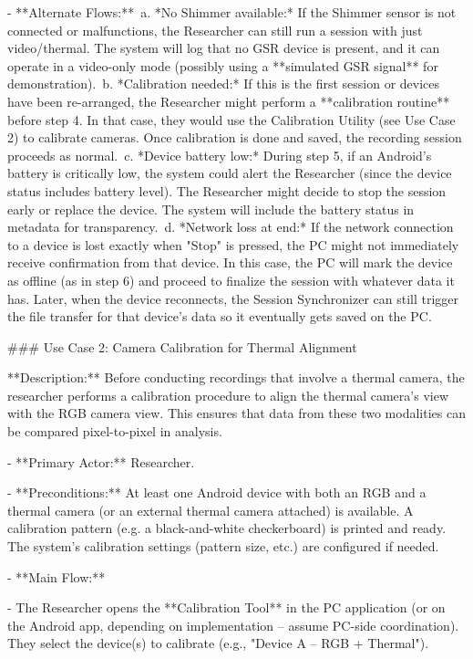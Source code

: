 \documentclass[12pt,a4paper]{article}
\begin{document}
- **Alternate Flows:**\
  a. *No Shimmer available:* If the Shimmer sensor is not connected or
  malfunctions, the Researcher can still run a session with just
  video/thermal. The system will log that no GSR device is present, and
  it can operate in a video-only mode (possibly using a **simulated GSR
  signal** for
  demonstration).\
  b. *Calibration needed:* If this is the first session or devices have
  been re-arranged, the Researcher might perform a **calibration
  routine** before step 4. In that case, they would use the Calibration
  Utility (see Use Case 2) to calibrate cameras. Once calibration is
  done and saved, the recording session proceeds as normal.\
  c. *Device battery low:* During step 5, if an Android's battery is
  critically low, the system could alert the Researcher (since the
  device status includes battery
  level).
  The Researcher might decide to stop the session early or replace the
  device. The system will include the battery status in metadata for
  transparency.\
  d. *Network loss at end:* If the network connection to a device is
  lost exactly when "Stop" is pressed, the PC might not immediately
  receive confirmation from that device. In this case, the PC will mark
  the device as offline (as in step 6) and proceed to finalize the
  session with whatever data it has. Later, when the device reconnects,
  the Session Synchronizer can still trigger the file transfer for that
  device's data so it eventually gets saved on the PC.

### Use Case 2: Camera Calibration for Thermal Alignment

**Description:** Before conducting recordings that involve a thermal
camera, the researcher performs a calibration procedure to align the
thermal camera's view with the RGB camera view. This ensures that data
from these two modalities can be compared pixel-to-pixel in analysis.

- **Primary Actor:** Researcher.

- **Preconditions:** At least one Android device with both an RGB and a
  thermal camera (or an external thermal camera attached) is available.
  A calibration pattern (e.g. a black-and-white checkerboard) is printed
  and ready. The system's calibration settings (pattern size, etc.) are
  configured if
  needed.

- **Main Flow:**

- The Researcher opens the **Calibration Tool** in the PC application
  (or on the Android app, depending on implementation -- assume PC-side
  coordination). They select the device(s) to calibrate (e.g., "Device A
  -- RGB + Thermal").
\end{document}
